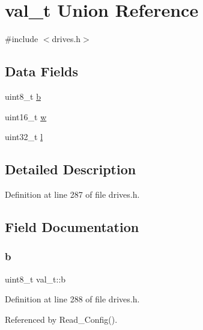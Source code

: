 \hypertarget{unionval__t}{}\section{val\+\_\+t Union Reference}
\label{unionval__t}


{\ttfamily \#include $<$drives.\+h$>$}

\subsection*{Data Fields}
\begin{DoxyCompactItemize}
\item 
uint8\+\_\+t \hyperlink{unionval__t_aa1beb825450163cb6c0f3bfeea7a8098}{b}
\item 
uint16\+\_\+t \hyperlink{unionval__t_a35ceb0f111824a2835370671131c38c0}{w}
\item 
uint32\+\_\+t \hyperlink{unionval__t_a9104daa7fde3f83545528fa75871bc84}{l}
\end{DoxyCompactItemize}


\subsection{Detailed Description}


Definition at line 287 of file drives.\+h.



\subsection{Field Documentation}
\mbox{\label{unionval__t_aa1beb825450163cb6c0f3bfeea7a8098}} 
\subsubsection{\texorpdfstring{b}{b}}
{\footnotesize\ttfamily uint8\+\_\+t val\+\_\+t\+::b}



Definition at line 288 of file drives.\+h.



Referenced by Read\+\_\+\+Config().

\mbox{\label{unionval__t_a9104daa7fde3f83545528fa75871bc84}} 
